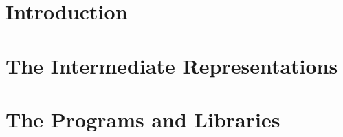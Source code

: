 


\maketitle

\tableofcontents

\part{Introduction}
\label{part:Introduction}




\part{The Intermediate Representations}
\label{part:The Intermediate Representations}







\part{The Programs and Libraries}
\label{part:The Programs and Libraries}
% 



% 

% 


% 
% 



